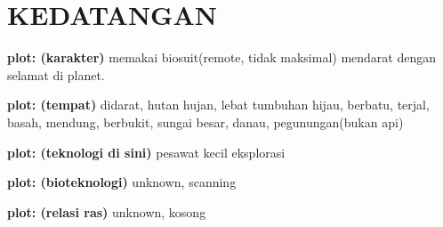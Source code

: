 \chapter{KEDATANGAN}

\textbf{plot: (karakter)} memakai biosuit(remote, tidak maksimal) mendarat dengan selamat di planet.

\textbf{plot: (tempat)} didarat, hutan hujan, lebat tumbuhan hijau, berbatu, terjal, basah, mendung, berbukit, sungai besar, danau, pegunungan(bukan api)

\textbf{plot: (teknologi di sini)} pesawat kecil eksplorasi

\textbf{plot: (bioteknologi)} unknown, scanning

\textbf{plot: (relasi ras)} unknown, kosong

